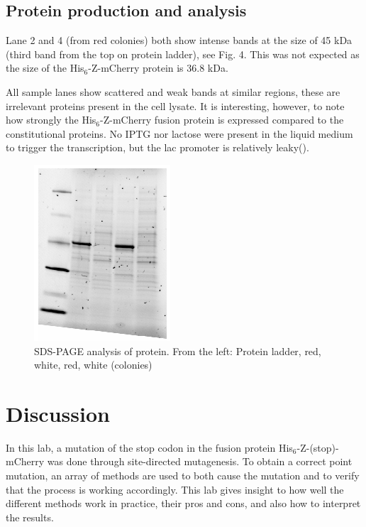 \documentclass[11pt,a4paper]{article}
\begin{document}
\subsection{Protein production and analysis}
Lane 2 and 4 (from red colonies) both show intense bands at the size of 45 kDa (third band from the top on protein ladder), see Fig. 4. This was not expected as the size of the His$_6$-Z-mCherry protein is 36.8 kDa. 

All sample lanes show scattered and weak bands at similar regions, these are irrelevant proteins present in the cell lysate. It is interesting, however, to note how strongly the His$_6$-Z-mCherry fusion protein is expressed compared to the constitutional proteins. No IPTG nor lactose were present in the liquid medium to trigger the transcription, but the lac promoter is relatively leaky(\cite{labbkomp}).
\begin{figure}[H]
    \centering
    \includegraphics[scale=0.5]{Protein UV.png}
    \caption{SDS-PAGE analysis of protein. From the left: Protein ladder, red, white, red, white (colonies)}
    \label{sds}
\end{figure}

\section{Discussion}

In this lab, a mutation of the stop codon in the fusion protein His$_6$-Z-(stop)-mCherry was done through site-directed mutagenesis. To obtain a correct point mutation, an array of methods are used to both cause the mutation and to verify that the process is working accordingly. This lab gives insight to how well the different methods work in practice, their pros and cons, and also how to interpret the results.
\end{document}
